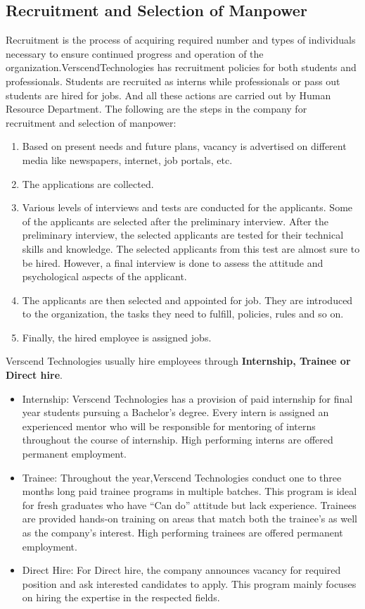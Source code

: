 \subsection{Recruitment and Selection of Manpower}
Recruitment is the process of acquiring required number and types of individuals necessary to ensure
continued progress and operation of the organization.VerscendTechnologies has recruitment
policies for both students and professionals. Students are recruited as interns while professionals or pass out
students are hired for jobs. And all these actions are carried out by Human Resource Department. The
following are the steps in the company for recruitment and selection of manpower:
\begin{enumerate}
\item  Based on present needs and future plans, vacancy is advertised on different media like newspapers,
internet, job portals, etc.
\item  The applications are collected.
\item  Various levels of interviews and tests are conducted for the applicants. Some of the applicants are
selected after the preliminary interview. After the preliminary interview, the selected applicants are
tested for their technical skills and knowledge. The selected applicants from this test are almost sure
to be hired. However, a final interview is done to assess the attitude and psychological aspects of
the applicant.
\item  The applicants are then selected and appointed for job. They are introduced to the organization, the
tasks they need to fulfill, policies, rules and so on.
\item  Finally, the hired employee is assigned jobs.
\end{enumerate}
Verscend Technologies usually hire employees through \textbf{Internship, Trainee or Direct hire}.
\begin{itemize}
\item Internship: Verscend Technologies has a provision of paid internship for final year students
pursuing a Bachelor's degree. Every intern is assigned an experienced mentor who will be responsible
for mentoring of interns throughout the course of internship. High performing interns are offered
permanent employment.

\item Trainee: Throughout the year,Verscend Technologies conduct one to three months long
paid trainee programs in multiple batches. This program is ideal for fresh graduates who have “Can
do” attitude but lack experience. Trainees are provided hands-on training on areas that match both the
trainee’s as well as the company’s interest. High performing trainees are offered permanent
employment.

\item Direct Hire: For Direct hire, the company announces vacancy for required position and ask interested
candidates to apply. This program mainly focuses on hiring the expertise in the respected fields.
\end{itemize}
